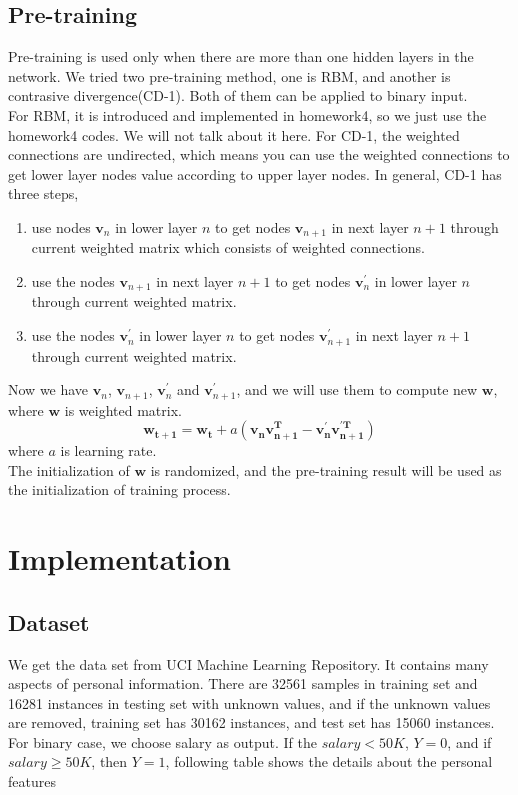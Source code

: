 \documentclass[11pt,letterpaper]{article}
\begin{document}
 \subsection{Pre-training}
\label{subsec:pretraining}
Pre-training is used only when there are more than one hidden layers in the network. We tried two pre-training method, one is RBM, and another is contrasive divergence(CD-1). Both of them can be applied to binary input. \\
For RBM, it is introduced and implemented in homework4, so we just use the homework4 codes. We will not talk about it here. For CD-1, the weighted connections are undirected, which means you can use the weighted connections to get lower layer nodes value according to upper layer nodes. In general, CD-1 has three steps,
\begin{enumerate}
\item use nodes $\mathbf{v}_n$ in lower layer $n$ to get nodes $\mathbf{v}_{n+1}$ in next layer $n+1$ through current weighted matrix which consists of weighted connections.
\item use the nodes $\mathbf{v}_{n+1}$ in next layer $n+1$ to get nodes $\mathbf{v}^{\prime}_n$ in lower layer $n$ through current weighted matrix.
\item use the nodes  $\mathbf{v}^{\prime}_n$ in lower layer $n$ to get nodes $\mathbf{v}^{\prime}_{n+1}$ in next layer $n+1$ through current weighted matrix.
\end{enumerate}
Now we have $\mathbf{v}_n$, $\mathbf{v}_{n+1}$, $\mathbf{v}^{\prime}_n$ and $\mathbf{v}^{\prime}_{n+1}$, and we will use them to compute new $\mathbf{w}$, where $\mathbf{w}$ is weighted matrix.
\begin{equation}
\label{cd1}
\mathbf{w_{t+1}} = \mathbf{w_t}+a(\mathbf{v_n}\mathbf{v^T_{n+1}}-\mathbf{v^{\prime}_n}\mathbf{v^{\prime T}_{n+1}})
\end{equation}
where $a$ is learning rate.\\
The initialization of $\mathbf{w}$ is randomized, and the pre-training result will be used as the initialization of training process.

\section{Implementation}
\subsection{Dataset}
We get the data set from UCI Machine Learning Repository. It contains many aspects of personal information. There are 32561 samples in training set and 16281 instances in testing set with unknown values, and if the unknown values are removed, training set has 30162 instances, and test set has 15060 instances. For binary case, we choose salary as output. If the $salary<50K$, $Y=0$, and if $salary \geq 50K$, then $Y=1$, following table shows the details about the personal features
\end{document}
